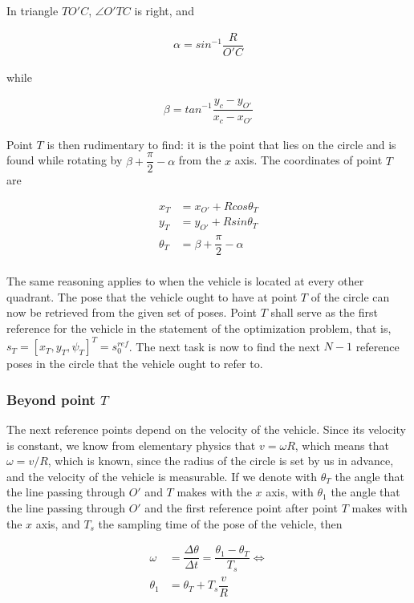 In triangle $TO'C$, $\angle O'TC$ is right, and

\begin{align}
  \alpha = sin^{-1} \dfrac{R}{O'C}
\end{align}

while

\begin{align}
  \beta = tan^{-1} \dfrac{y_c - y_{O'}}{x_c - x_{O'}}
\end{align}

Point $T$ is then rudimentary to find: it is the point that lies on the
circle and is found while rotating by $\beta + \dfrac{\pi}{2} - \alpha$ from the
$x$ axis. The coordinates of point $T$ are

\begin{align}
  x_T &= x_{O'} + R cos\theta_T \\
  y_T &= y_{O'} + R sin\theta_T \\
  \theta_T &= \beta + \dfrac{\pi}{2} - \alpha \\
\end{align}

The same reasoning applies to when the vehicle is located at every other
quadrant. The pose that the vehicle ought to have at point $T$ of the circle
can now be retrieved from the given set of poses. Point $T$ shall serve as the
first reference for the vehicle in the statement of the optimization problem,
that is, $s_T = [x_T, y_T, \psi_T]^T = s_0^{ref}$. The next task is now to
find the next $N-1$ reference poses in the circle that the vehicle ought to
refer to.

\subsubsection{Beyond point $T$}

The next reference points depend on the velocity of the vehicle. Since its
velocity is constant, we know from elementary physics that $v = \omega R$,
which means that $\omega = v / R$, which is known, since the radius of the
circle is set by us in advance, and the velocity of the vehicle is measurable.
If we denote with $\theta_T$ the angle that the line passing through $O'$
and $T$ makes with the $x$ axis, with $\theta_1$ the angle that the line
passing through $O'$ and the first reference point after point $T$ makes with
the $x$ axis, and $T_s$ the sampling time of the pose of the vehicle, then

\begin{align}
  \omega &= \dfrac{\Delta \theta}{\Delta t} = \dfrac{\theta_1 - \theta_T}{T_s} \Leftrightarrow \\
  \theta_1 &= \theta_T + T_s \dfrac{v}{R} \\
\end{align}

